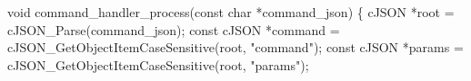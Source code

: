 \documentclass[a4paper]{extarticle}
\newenvironment{Shaded}{}{}
\newcommand{\DataTypeTok}[1]{\textcolor[rgb]{0.56,0.13,0.00}{#1}}
\newcommand{\NormalTok}[1]{#1}
\newcommand{\OperatorTok}[1]{\textcolor[rgb]{0.40,0.40,0.40}{#1}}
\newcommand{\StringTok}[1]{\textcolor[rgb]{0.25,0.44,0.63}{#1}}
\begin{document}
\begin{Shaded}
\begin{Highlighting}[]
\DataTypeTok{void}\NormalTok{ command\_handler\_process}\OperatorTok{(}\DataTypeTok{const} \DataTypeTok{char} \OperatorTok{*}\NormalTok{command\_json}\OperatorTok{)} \OperatorTok{\{}
\NormalTok{    cJSON }\OperatorTok{*}\NormalTok{root }\OperatorTok{=}\NormalTok{ cJSON\_Parse}\OperatorTok{(}\NormalTok{command\_json}\OperatorTok{);}
    \DataTypeTok{const}\NormalTok{ cJSON }\OperatorTok{*}\NormalTok{command }\OperatorTok{=}\NormalTok{ cJSON\_GetObjectItemCaseSensitive}\OperatorTok{(}\NormalTok{root}\OperatorTok{,} \StringTok{"command"}\OperatorTok{);}
    \DataTypeTok{const}\NormalTok{ cJSON }\OperatorTok{*}\NormalTok{params }\OperatorTok{=}\NormalTok{ cJSON\_GetObjectItemCaseSensitive}\OperatorTok{(}\NormalTok{root}\OperatorTok{,} \StringTok{"params"}\OperatorTok{);}


\end{Highlighting}
\end{Shaded}
\end{document}
